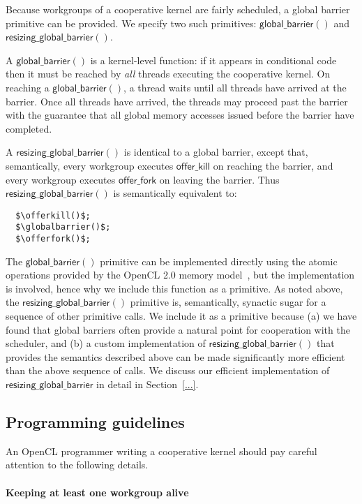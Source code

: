 \documentclass[nocopyrightspace]{sigplanconf-pldi16}
\newcommand{\offerfork}{\mathsf{offer\_fork}}
\newcommand{\offerkill}{\mathsf{offer\_kill}}
\newcommand{\globalbarrier}{\mathsf{global\_barrier}}
\newcommand{\resizingglobalbarrier}{\mathsf{resizing\_global\_barrier}}
\begin{document}
Because workgroups of a cooperative kernel are fairly scheduled, a
global barrier primitive can be provided.  We specify two such primitives: $\globalbarrier()$
and $\resizingglobalbarrier()$.

A $\globalbarrier()$ is a kernel-level function: if it appears in
conditional code then it must be reached by \emph{all} threads
executing the cooperative kernel.  On reaching a $\globalbarrier()$, a
thread waits until all threads have arrived at the barrier.  Once all
threads have arrived, the threads may proceed past the barrier with
the guarantee that all global memory accesses issued before the
barrier have completed.

A $\resizingglobalbarrier()$ is identical to a global barrier, except
that, semantically, every workgroup executes $\offerkill$ on reaching
the barrier, and every workgroup executes $\offerfork$ on leaving the
barrier.  Thus $\resizingglobalbarrier()$ is semantically equivalent to:
%
\lstset{basicstyle=\tt}
\begin{lstlisting}
  $\offerkill()$;
  $\globalbarrier()$;
  $\offerfork()$;
\end{lstlisting}
\lstset{basicstyle=\scriptsize\tt}

The $\globalbarrier()$ primitive can be implemented directly using the
atomic operations provided by the OpenCL 2.0 memory model~\cite{...},
but the implementation is involved, hence why we include this function
as a primitive.  As noted above, the $\resizingglobalbarrier()$
primitive is, semantically, synactic sugar for a sequence of other
primitive calls.  We include it as a primitive because (a) we have
found that global barriers often provide a natural point for
cooperation with the scheduler, and (b) a custom implementation of
$\resizingglobalbarrier()$ that provides the semantics described
above can be made significantly more efficient than the above sequence of
calls.  We discuss our efficient implementation of
$\resizingglobalbarrier$ in detail in Section~\ref{...}.


\subsection{Programming guidelines}

An OpenCL programmer writing a cooperative kernel should pay careful
attention to the following details.

\paragraph{Keeping at least one workgroup alive}
\end{document}

